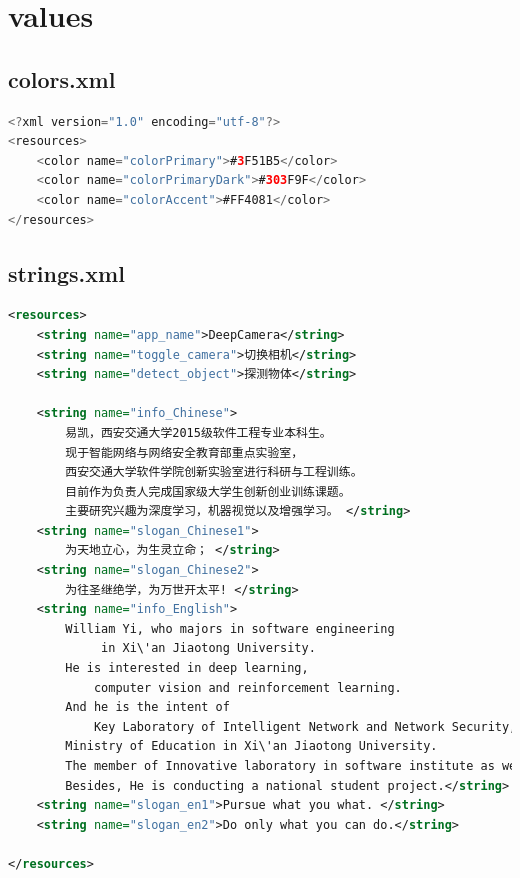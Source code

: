 \documentclass[UTF8, Microsoft YaHei]{book}
\begin{document}
    \section{values}
    \subsection{colors.xml}
\begin{small}
\begin{lstlisting}[language=java]
<?xml version="1.0" encoding="utf-8"?>
<resources>
    <color name="colorPrimary">#3F51B5</color>
    <color name="colorPrimaryDark">#303F9F</color>
    <color name="colorAccent">#FF4081</color>
</resources>
\end{lstlisting}
\end{small}
    \subsection{strings.xml}
\begin{small}
\begin{lstlisting}[language=xml]
<resources>
    <string name="app_name">DeepCamera</string>
    <string name="toggle_camera">切换相机</string>
    <string name="detect_object">探测物体</string>

    <string name="info_Chinese">
    	易凯，西安交通大学2015级软件工程专业本科生。
        现于智能网络与网络安全教育部重点实验室，
        西安交通大学软件学院创新实验室进行科研与工程训练。
        目前作为负责人完成国家级大学生创新创业训练课题。
        主要研究兴趣为深度学习，机器视觉以及增强学习。 </string>
    <string name="slogan_Chinese1">
    	为天地立心，为生灵立命； </string>
    <string name="slogan_Chinese2">
    	为往圣继绝学，为万世开太平! </string>
    <string name="info_English">
    	William Yi, who majors in software engineering
    		 in Xi\'an Jiaotong University.
        He is interested in deep learning,
        	computer vision and reinforcement learning.
        And he is the intent of
        	Key Laboratory of Intelligent Network and Network Security,
        Ministry of Education in Xi\'an Jiaotong University.
        The member of Innovative laboratory in software institute as well.
        Besides, He is conducting a national student project.</string>
    <string name="slogan_en1">Pursue what you what. </string>
    <string name="slogan_en2">Do only what you can do.</string>

</resources>
\end{lstlisting}
\end{small}
\end{document}

